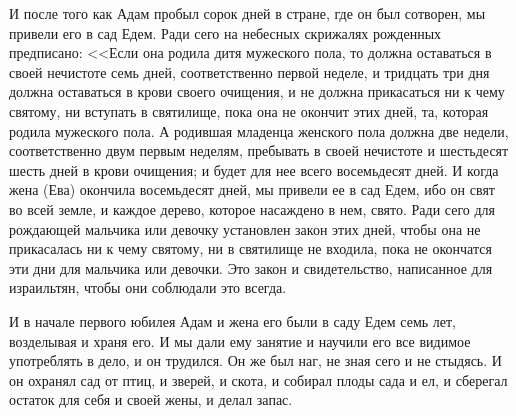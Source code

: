 И после того как Адам пробыл сорок дней в стране, где он был сотворен, мы
привели его в сад Едем. Ради сего на небесных скрижалях рожденных предписано:
<<Если она родила дитя мужеского пола, то должна оставаться в своей
нечистоте семь дней, соответственно первой неделе, и тридцать три дня должна
оставаться в крови своего очищения, и не должна прикасаться ни к чему святому,
ни вступать в святилище, пока она не окончит этих дней, та, которая родила
мужеского пола. А родившая младенца женского пола должна две недели,
соответственно двум первым неделям, пребывать в своей нечистоте и шестьдесят
шесть дней в крови очищения; и будет для нее всего восемьдесят дней. И когда
жена (Ева) окончила восемьдесят дней, мы привели ее в сад Едем, ибо он свят во
всей земле, и каждое дерево, которое насаждено в нем, свято. Ради сего для
рождающей мальчика или девочку установлен закон этих дней, чтобы она не
прикасалась ни к чему святому, ни в святилище не входила, пока не окончатся эти
дни для мальчика или девочки. Это закон и свидетельство, написанное для
израильтян, чтобы они соблюдали это всегда.

И в начале первого юбилея Адам и жена его были в саду Едем семь лет,
возделывая и храня его. И мы дали ему занятие и научили его все видимое
употреблять в дело, и он трудился. Он же был наг, не зная сего и не стыдясь. И
он охранял сад от птиц, и зверей, и скота, и собирал плоды сада и ел, и
сберегал остаток для себя и своей жены, и делал запас.

